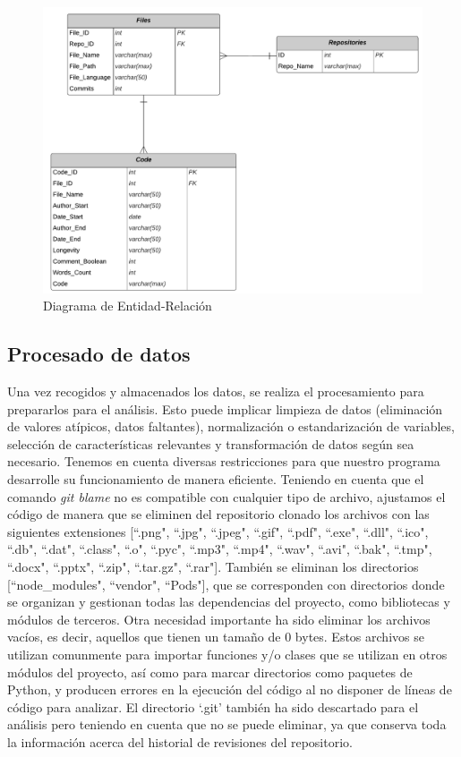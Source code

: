 \documentclass[a4paper, 12pt]{book}
\begin{document}
\begin{figure}
  \centering
  \includegraphics[width=14cm, keepaspectratio]{img/Diagrama_E-R.png}
  \caption{Diagrama de Entidad-Relación}
  \label{fig:entidad-relacion}
\end{figure}


\subsection{Procesado de datos}
\label{subsec:procesado}

Una vez recogidos y almacenados los datos, se realiza el procesamiento para prepararlos para el análisis. Esto puede implicar limpieza de datos (eliminación de valores atípicos, datos faltantes), normalización o estandarización de variables, selección de características relevantes y
transformación de datos según sea necesario.
Tenemos en cuenta diversas restricciones para que nuestro programa desarrolle su funcionamiento de manera eficiente. Teniendo en cuenta que el comando \textit{git blame} no es compatible con cualquier tipo de archivo, ajustamos el código
de manera que se eliminen del repositorio clonado los archivos con las siguientes extensiones [``.png", ``.jpg", ``.jpeg", ``.gif", ``.pdf", ``.exe", ``.dll", ``.ico", ``.db", ``.dat", ``.class", ``.o", ``.pyc", ``.mp3", ``.mp4", ``.wav", ``.avi", ``.bak", ``.tmp", ``.docx", ``.pptx", ``.zip",
``.tar.gz", ``.rar"]. También se eliminan los directorios [``node\_modules", ``vendor", ``Pods"], que se corresponden con directorios donde se organizan y gestionan todas las dependencias del proyecto, como bibliotecas y módulos de terceros. Otra necesidad importante ha sido
eliminar los archivos vacíos, es decir, aquellos que tienen un tamaño de 0 bytes. Estos archivos se utilizan comunmente para importar funciones y/o clases que se utilizan en otros módulos del proyecto, así como para marcar directorios como paquetes de Python, y producen errores
en la ejecución del código al no disponer de líneas de código para analizar. El directorio `.git' también ha sido descartado para el análisis pero teniendo en cuenta que no se puede eliminar, ya que conserva toda la información acerca del historial de revisiones del repositorio.
\end{document}
